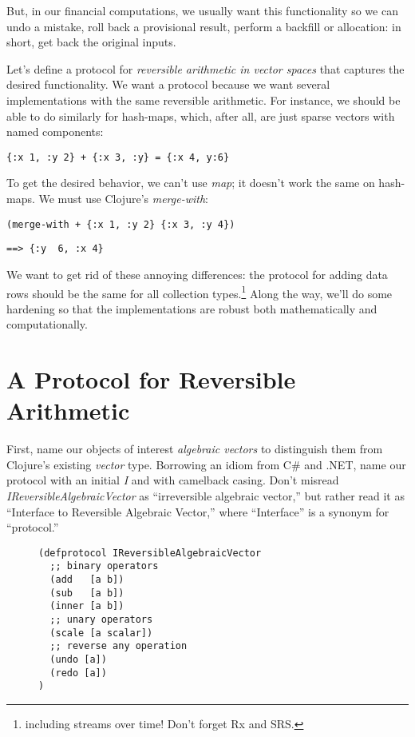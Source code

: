 \documentclass[11pt]{article}
\begin{document}
But, in our financial computations, we usually want this functionality
so we can undo a mistake, roll back a provisional result, perform a
backfill or allocation: in short, get back the original inputs.

Let's define a protocol for \emph{reversible arithmetic in vector spaces}
that captures the desired functionality.  We want a protocol because we
want several implementations with the same reversible arithmetic.  For
instance, we should be able to do similarly for hash-maps, which, after
all, are just sparse vectors with named components:
\begin{verbatim}
{:x 1, :y 2} + {:x 3, :y} = {:x 4, y:6}
\end{verbatim}

To get the desired behavior, we can't use \emph{map}; it doesn't work the
same on hash-maps.  We must use Clojure's \emph{merge-with}:
\begin{verbatim}
(merge-with + {:x 1, :y 2} {:x 3, :y 4})
\end{verbatim}
\begin{verbatim}
==> {:y  6, :x 4}
\end{verbatim}

We want to get rid of these annoying differences: the protocol for
adding data rows should be the same for all collection
types.\footnote{including streams over time! Don't forget Rx and SRS.}  Along
the way, we'll do some hardening so that the implementations are robust
both mathematically and computationally.
\section{A Protocol for Reversible Arithmetic}
\label{sec-2}

First, name our objects of interest \emph{algebraic vectors} to distinguish
them from Clojure's existing \emph{vector} type.  Borrowing an idiom from C\#
and .NET, name our protocol with an initial \emph{I} and with camelback
casing.  Don't misread \emph{IReversibleAlgebraicVector} as ``irreversible
algebraic vector,'' but rather read it as ``Interface to Reversible
Algebraic Vector,'' where ``Interface'' is a synonym for ``protocol.''

\begin{figure}[H]
\label{reversible-algebraic-vector-protocol}
\begin{verbatim}
(defprotocol IReversibleAlgebraicVector
  ;; binary operators
  (add   [a b])
  (sub   [a b])
  (inner [a b])
  ;; unary operators
  (scale [a scalar])
  ;; reverse any operation
  (undo [a])
  (redo [a])
)
\end{verbatim}
\end{figure}
\end{document}
